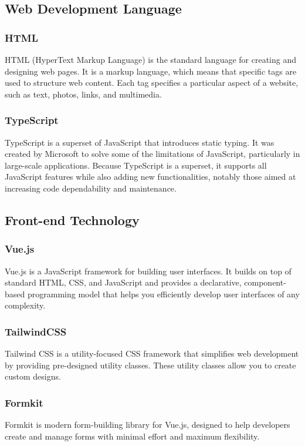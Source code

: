 \documentclass[12pt,oneside,openright,a4paper]{cpe-english-project}
\begin{document}
\subsection{Web Development Language}
\subsubsection{HTML} HTML (HyperText Markup Language) is the standard language for creating and designing web pages. It is a markup language, which means that specific tags are used to structure web content. Each tag specifies a particular aspect of a website, such as text, photos, links, and multimedia.

\subsubsection{TypeScript} TypeScript is a superset of JavaScript that introduces static typing. It was created by Microsoft to solve some of the limitations of JavaScript, particularly in large-scale applications. Because TypeScript is a superset, it supports all JavaScript features while also adding new functionalities, notably those aimed at increasing code dependability and maintenance.

\subsection{Front-end Technology}
\subsubsection{Vue.js} Vue.js is a JavaScript framework for building user interfaces. It builds on top of standard HTML, CSS, and JavaScript and provides a declarative, component-based programming model that helps you efficiently develop user interfaces of any complexity.

\subsubsection{TailwindCSS} Tailwind CSS is a utility-focused CSS framework that simplifies web development by providing pre-designed utility classes. These utility classes allow you to create custom designs.

\subsubsection{Formkit} Formkit is modern form-building library for Vue.js, designed to help developers create and manage forms with minimal effort and maximum flexibility.
\end{document}
